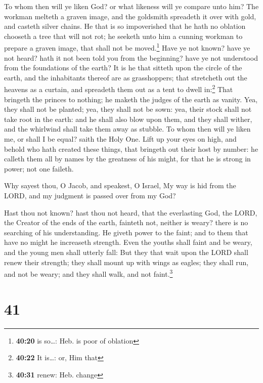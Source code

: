 To whom then will ye liken God? or what likeness will ye
compare unto him?  The workman melteth a graven image,
and the goldsmith spreadeth it over with gold, and casteth silver
chains.  He that is so impoverished that he hath no
oblation chooseth a tree that will not rot; he seeketh unto him a
cunning workman to prepare a graven image, that shall not be
moved.\footnote{\textbf{40:20} is so\ldots: Heb. is poor of oblation}
 Have ye not known? have ye not heard? hath it not been
told you from the beginning? have ye not understood from the foundations
of the earth?  It is he that sitteth upon the circle of
the earth, and the inhabitants thereof are as grasshoppers; that
stretcheth out the heavens as a curtain, and spreadeth them out as a
tent to dwell in:\footnote{\textbf{40:22} It is\ldots: or, Him that}
 That bringeth the princes to nothing; he maketh the
judges of the earth as vanity.  Yea, they shall not be
planted; yea, they shall not be sown: yea, their stock shall not take
root in the earth: and he shall also blow upon them, and they shall
wither, and the whirlwind shall take them away as stubble.
 To whom then will ye liken me, or shall I be equal?
saith the Holy One.  Lift up your eyes on high, and
behold who hath created these things, that bringeth out their host by
number: he calleth them all by names by the greatness of his might, for
that he is strong in power; not one faileth.

 Why sayest thou, O Jacob, and speakest, O Israel, My way
is hid from the LORD, and my judgment is passed over from my God?

 Hast thou not known? hast thou not heard, that the
everlasting God, the LORD, the Creator of the ends of the earth,
fainteth not, neither is weary? there is no searching of his
understanding.  He giveth power to the faint; and to them
that have no might he increaseth strength.  Even the
youths shall faint and be weary, and the young men shall utterly fall:
 But they that wait upon the LORD shall renew their
strength; they shall mount up with wings as eagles; they shall run, and
not be weary; and they shall walk, and not faint.\footnote{\textbf{40:31}
  renew: Heb. change}

\hypertarget{section-40}{%
\section{41}\label{section-40}}

